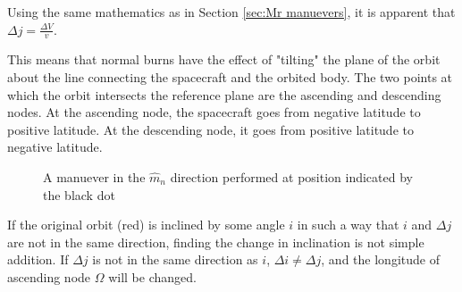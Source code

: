 \documentclass{article}
\begin{document}
Using the same mathematics as in Section \ref{sec:Mr manuevers}, it is apparent that $\Delta j=\frac{\Delta V}{v}$.

This means that normal burns have the effect of "tilting" the plane of the orbit about the line connecting the spacecraft and the orbited body. The two points at which the orbit intersects the reference plane are the ascending and descending nodes. At the ascending node, the spacecraft goes from negative latitude to positive latitude. At the descending node, it goes from positive latitude to negative latitude.

\begin{figure}[H]
    \centering
    \def\ecc{0}
    \def\SMA{3}
    \def\incI{20}
    \def\dJ{20}


    \caption{A manuever in the $\hat{m}_n$ direction performed at position indicated by the black dot}\label{fig:Inclination Changes}
\end{figure}

If the original orbit (red) is inclined by some angle $i$ in such a way that $i$ and $\Delta j$ are not in the same direction, finding the change in inclination is not simple addition. If $\Delta j$ is not in the same direction as $i$, $\Delta i \ne \Delta j$, and the longitude of ascending node $\Omega$ will be changed.
\end{document}
